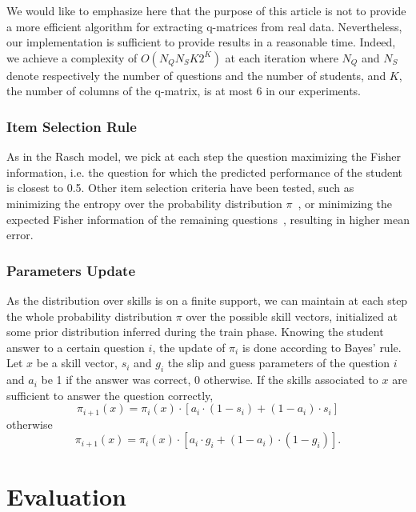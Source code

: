 \documentclass{sig-alternate}
\begin{document}
We would like to emphasize here that the purpose of this article is not to provide a more efficient algorithm for extracting q-matrices from real data. Nevertheless, our implementation is sufficient to provide results in a reasonable time. Indeed, we achieve a complexity of $O(N_Q N_S K 2^K)$ at each iteration where $N_Q$ and $N_S$ denote respectively the number of questions and the number of students, and $K$, the number of columns of the q-matrix, is at most 6 in our experiments.

\subsubsection{Item Selection Rule}

As in the Rasch model, we pick at each step the question maximizing the Fisher information, i.e. the question for which the predicted performance of the student is closest to 0.5. Other item selection criteria have been tested, such as minimizing the entropy over the probability distribution $\pi$~\cite{Huebner2010}, or minimizing the expected Fisher information of the remaining questions~\cite{MagisRaiche2012}, resulting in higher mean error.

\subsubsection{Parameters Update}

As the distribution over skills is on a finite support, we can maintain at each step the whole probability distribution $\pi$ over the possible skill vectors, initialized at some prior distribution inferred during the train phase.
Knowing the student answer to a certain question $i$, the update of $\pi_i$ is done according to Bayes' rule. Let $x$ be a skill vector, $s_i$ and $g_i$ the slip and guess parameters of the question $i$ and $a_i$ be 1 if the answer was correct, 0 otherwise. If the skills associated to $x$ are sufficient to answer the question correctly,
\[ \pi_{i+1}(x) = \pi_i(x) \cdot [a_i \cdot(1-s_i) + (1-a_i)\cdot s_i] \]
otherwise
\[ \pi_{i+1}(x) = \pi_i(x) \cdot [a_i \cdot g_i + (1-a_i)\cdot(1-g_i)]. \]

\section{Evaluation}
\end{document}
